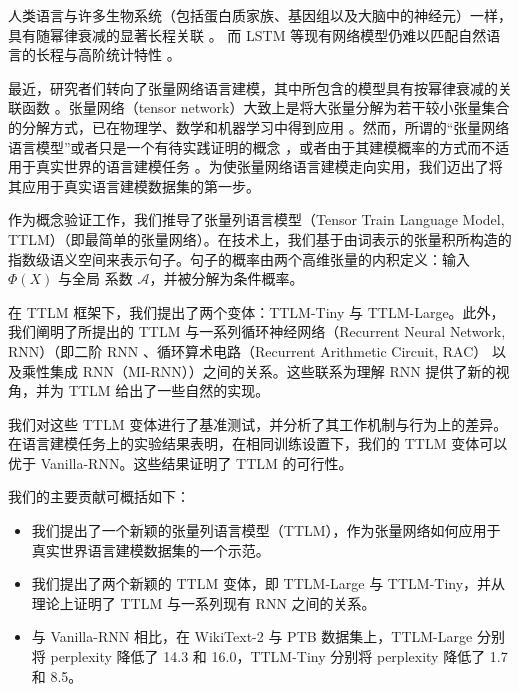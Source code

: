 \documentclass{article}
\theoremstyle{plain}
\theoremstyle{definition}
\theoremstyle{remark}
\begin{document}

人类语言与许多生物系统（包括蛋白质家族、基因组以及大脑中的神经元）一样，具有随幂律衰减的显著长程关联 \citep{tagliazucchi2012criticality, mora2011biological}。
而 LSTM \cite{hochreiter1997long} 等现有网络模型仍难以匹配自然语言的长程与高阶统计特性 \citep{lin2016critical}。


最近，研究者们转向了张量网络语言建模，其中所包含的模型具有按幂律衰减的关联函数 \citep{pestun2017tensor,pestun2017language,miller2021tensor}。张量网络（tensor network）大致上是将大张量分解为若干较小张量集合的分解方式，已在物理学、数学和机器学习中得到应用 \citep{cohen2016expressive}。然而，所谓的“张量网络语言模型”或者只是一个有待实践证明的概念 \cite{pestun2017tensor}，或者由于其建模概率的方式而不适用于真实世界的语言建模任务 \citep{miller2021tensor}。为使张量网络语言建模走向实用，我们迈出了将其应用于真实语言建模数据集的第一步。

作为概念验证工作，我们推导了张量列语言模型（Tensor Train Language Model, TTLM）（即最简单的张量网络）。在技术上，我们基于由词表示的张量积所构造的指数级语义空间来表示句子。句子的概率由两个高维张量的内积定义：输入 $\Phi(X)$ 与全局
系数 $\mathcal{A}$，并被分解为条件概率。

在 TTLM 框架下，我们提出了两个变体：TTLM-Tiny 与 TTLM-Large。此外，我们阐明了所提出的 TTLM 与一系列循环神经网络（Recurrent Neural Network, RNN）（即二阶 RNN \citep{goudreau1994first}、循环算术电路（Recurrent Arithmetic Circuit, RAC）\citep{levine2018benefits} 以及乘性集成 RNN（MI-RNN）\citep{wu_multiplicative_2016}）之间的关系。这些联系为理解 RNN 提供了新的视角，并为 TTLM 给出了一些自然的实现。


我们对这些 TTLM 变体进行了基准测试，并分析了其工作机制与行为上的差异。在语言建模任务上的实验结果表明，在相同训练设置下，我们的 TTLM 变体可以优于 Vanilla-RNN。这些结果证明了 TTLM 的可行性。


我们的主要贡献可概括如下：
\begin{itemize}
    \item 我们提出了一个新颖的张量列语言模型（TTLM），作为张量网络如何应用于真实世界语言建模数据集的一个示范。
    \item 我们提出了两个新颖的 TTLM 变体，即 TTLM-Large 与 TTLM-Tiny，并从理论上证明了 TTLM 与一系列现有 RNN 之间的关系。
    \item 与 Vanilla-RNN 相比，在 WikiText-2 与 PTB 数据集上，TTLM-Large 分别将 perplexity 降低了 14.3 和 16.0，TTLM-Tiny 分别将 perplexity 降低了 1.7 和 8.5。
\end{itemize}
\end{document}
